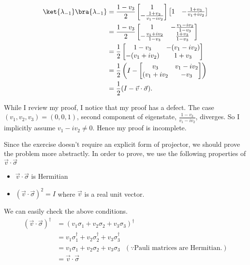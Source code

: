 \documentclass[a4paper,12pt]{article}
\begin{document}
\begin{align*}
	\ket{\lambda_{-1}}\bra{\lambda_{-1}} &= \frac{1 - v_3}{2} \begin{bmatrix}
	1 \\
	- \frac{1+v_3}{v_1 - iv_2}
	\end{bmatrix}
	\begin{bmatrix}
		1 & - \frac{1+v_3}{v_1 + iv_2}
	\end{bmatrix}\\
	&=
	\frac{1 - v_3}{2} \begin{bmatrix}
		1 & - \frac{v_1 - iv_2}{1 - v_3} \\
		- \frac{v_1 + iv_2}{1 - v_3} & \frac{1+v_3}{1 - v_3}
	\end{bmatrix} \\
	&=
	\frac{1}{2} \begin{bmatrix}
		1 - v_3 & -(v_1 - iv_2) \\
		- (v_1 + iv_2) & 1 + v_3
	\end{bmatrix} \\
	&=
	\frac{1}{2} \left( I - \begin{bmatrix}
		v_3 & v_1 - iv_2 \\
		(v_1 + iv_2 & - v_3
	\end{bmatrix} \right)\\
	&= \frac{1}{2} (I - \vec{v} \cdot \vec{\sigma} ).
\end{align*}


	While I review my proof, I notice that my proof has a defect.
	The case $(v_1,v_2,v_3) = (0,0,1)$, second component of eigenstate, $\frac{1-v_3}{v_1 - iv_2}$, diverges.
	So I implicitly assume $v_1 - iv_2 \neq 0$. Hence my proof is incomplete.

	Since the exercise doesn't require an explicit form of projector, we should prove the problem more abstractly.
	In order to prove, we use the following properties of $\vec{v} \cdot \vec{\sigma}$
	\begin{itemize}
		\item $\vec{v} \cdot \vec{\sigma}$ is Hermitian
		\item $(\vec{v} \cdot \vec{\sigma})^2 = I$ where $\vec{v}$ is a real unit vector.
	\end{itemize}

	We can easily check the above conditions.
	\begin{align*}
	(\vec{v} \cdot \vec{\sigma})^\dagger &= (v_1 \sigma_1 + v_2 \sigma_2 + v_3 \sigma_3)^\dagger\\
	&= v_1 \sigma_1^\dagger + v_2 \sigma_2^\dagger + v_3 \sigma_3^\dagger\\
	&= v_1 \sigma_1 + v_2 \sigma_2 + v_3 \sigma_3~~~(\because \text{Pauli matrices are Hermitian.})\\
	&= \vec{v} \cdot \vec{\sigma}
	\end{align*}
\end{document}
